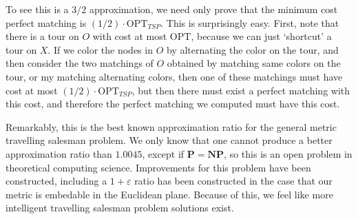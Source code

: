 To see this is a $3/2$ approximation, we need only prove that the minimum cost perfect matching is $(1/2) \cdot \text{OPT}_{TSP}$. This is surprisingly easy. First, note that there is a tour on $O$ with cost at most $\text{OPT}$, because we can just `shortcut' a tour on $X$. If we color the nodes in $O$ by alternating the color on the tour, and then consider the two matchings of $O$ obtained by matching same colors on the tour, or my matching alternating colors, then one of these matchings must have cost at most $(1/2) \cdot \text{OPT}_{TSP}$, but then there must exist a perfect matching with this cost, and therefore the perfect matching we computed must have this cost.

Remarkably, this is the best known approximation ratio for the general metric travelling salesman problem. We only know that one cannot produce a better approximation ratio than $1.0045$, except if $\mathbf{P} = \mathbf{NP}$, so this is an open problem in theoretical computing science. Improvements for this problem have been constructed, including a $1 + \varepsilon$ ratio has been constructed in the case that our metric is embedable in the Euclidean plane. Because of this, we feel like more intelligent travelling salesman problem solutions exist.

